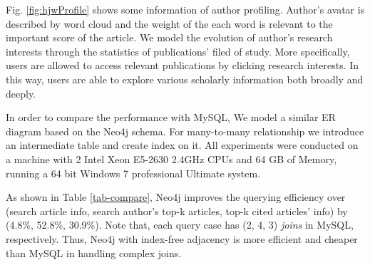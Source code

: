 \par
Fig. \ref{fig:hjwProfile} shows some information of author profiling. Author's avatar is described by word cloud and the weight of the each word is relevant to the important score of the article. We model the evolution of author's research interests through the statistics of publications' filed of study. More specifically, users are allowed to access relevant publications by clicking research interests. In this way, users are able to explore various scholarly information both broadly and deeply.



 In order to compare the performance with MySQL, We model a similar ER diagram based on the Neo4j schema. For many-to-many relationship we introduce an intermediate table and create index on it. All experiments were conducted on a machine with 2 Intel Xeon E5-2630 2.4GHz CPUs and 64 GB of Memory, running a 64 bit Windows 7 professional Ultimate system.
\par
As shown in Table \ref{tab-compare}, Neo4j improves the querying efficiency over (search article info, search author's top-k articles, top-k cited articles' info) by (4.8\%, 52.8\%, 30.9\%). Note that, each query case has (2, 4, 3) {\em joins} in MySQL, respectively. Thus, Neo4j with index-free adjacency is more efficient and cheaper than MySQL in handling complex joins.





